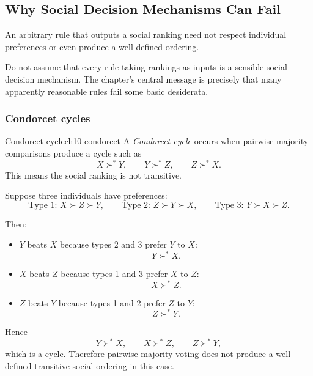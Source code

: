 \subsection{Why Social Decision Mechanisms Can Fail}

An arbitrary rule that outputs a social ranking need not respect individual preferences or even produce a well-defined ordering.

\begin{commonmistake}
Do not assume that every rule taking rankings as inputs is a sensible social decision mechanism. The chapter's central message is precisely that many apparently reasonable rules fail some basic desiderata.
\end{commonmistake}

\subsubsection{Condorcet cycles}

\begin{definition}{Condorcet cycle}{ch10-condorcet}
A \emph{Condorcet cycle} occurs when pairwise majority comparisons produce a cycle such as
\[
X \succ^* Y,\qquad Y \succ^* Z,\qquad Z \succ^* X.
\]
This means the social ranking is not transitive.
\end{definition}

\begin{examplebox}[title={Worked Example: Condorcet cycle under pairwise majority voting}]
Suppose three individuals have preferences:
\[
\text{Type 1: } X \succ Z \succ Y,
\qquad
\text{Type 2: } Z \succ Y \succ X,
\qquad
\text{Type 3: } Y \succ X \succ Z.
\]

Then:
\begin{itemize}
    \item $Y$ beats $X$ because types 2 and 3 prefer $Y$ to $X$:
    \[
    Y \succ^* X.
    \]
    \item $X$ beats $Z$ because types 1 and 3 prefer $X$ to $Z$:
    \[
    X \succ^* Z.
    \]
    \item $Z$ beats $Y$ because types 1 and 2 prefer $Z$ to $Y$:
    \[
    Z \succ^* Y.
    \]
\end{itemize}

Hence
\[
Y \succ^* X,\qquad X \succ^* Z,\qquad Z \succ^* Y,
\]
which is a cycle. Therefore pairwise majority voting does not produce a well-defined transitive social ordering in this case.
\end{examplebox}

